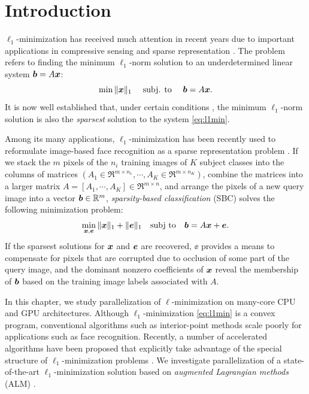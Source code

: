 \section{Introduction} 
%
$\ell_1$-minimization has received much attention in recent years due to
important applications in compressive sensing \cite{BrucksteinA2007} and sparse
representation \cite{WrightJ2010-PIEEE}.  The problem refers to finding the
minimum $\ell_1$-norm solution to an underdetermined linear system $\boldsymbol{b}=A{\boldsymbol{x}}$:
%
\begin{equation} \min \|{\boldsymbol{x}}\|_1\quad \mbox{ subj. to }\quad \boldsymbol{b} = A{\boldsymbol{x}}.
\label{eq:l1min} \end{equation}
%
It is now well established that, under certain conditions
\cite{CandesE2005-IT_1,DonohoD2004}, the minimum $\ell_1$-norm solution is also
the \emph{sparsest} solution to the system \eqref{eq:l1min}.

Among its many applications, $\ell_1$-minimization has been recently used to reformulate
image-based face recognition as a sparse representation problem
\cite{WrightJ2009-PAMI}.  If we stack the $m$ pixels of the $n_i$ training images of $K$ subject
classes into the columns of matrices $(A_1\in\Re^{m\times n_1}, \cdots, A_K\in\Re^{m\times n_K})$, combine
the matrices into a larger matrix $A = [A_1, \cdots, A_K]\in\Re^{m\times n}$, and arrange the pixels of a new
query image into a vector $\boldsymbol{b}\in\mathbb R^m$, \emph{sparsity-based
classification} (SBC) solves the following minimization problem:
\begin{equation}
\min_{{\boldsymbol{x}}, {\boldsymbol{e}}} \| {\boldsymbol{x}} \|_1 + \|{\boldsymbol{e}}\|_1 \quad \textup{subj to} \quad \boldsymbol{b} = A {\boldsymbol{x}} + {\boldsymbol{e}}.
\label{eq:l1min_denoise}
\end{equation}
If the sparsest solutions for ${\boldsymbol{x}}$ and $\boldsymbol{e}$ are recovered, $\ee$ provides a
means to compensate for pixels that are corrupted due to occlusion of some part of the query
image, and the dominant nonzero coefficients of ${\boldsymbol{x}}$ reveal the membership of
$\boldsymbol{b}$ based on the training image labels associated with $A$. 

In this chapter, we study parallelization of $\ell$-minimization on many-core CPU and GPU
architectures. Although $\ell_1$-minimization \eqref{eq:l1min} is a convex
program, conventional algorithms such as interior-point methods
\cite{ChenS2001-SIAM,TibshiraniR1996} scale poorly
for applications such as face recognition. Recently, a number of
accelerated algorithms have been proposed that explicitly take advantage of
the special structure of $\ell_1$-minimization problems
\cite{LorisI2009,YangA2010-ICIP}. We investigate parallelization of a
state-of-the-art $\ell_1$-minimization solution based on
\emph{augmented Lagrangian methods} (ALM) \cite{BertsekasD2003,YangA2010-ICIP}.

